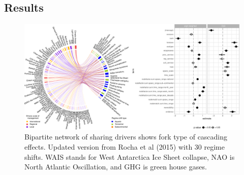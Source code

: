 \documentclass[9pt,]{article}
\begin{document}
\subsection{Results}\label{results}

\begin{figure}

{\centering \includegraphics{170830_draftCascadingEffects_files/figure-latex/Fig3-1} 

}

\caption{Bipartite network of sharing drivers shows fork type of cascading effects. Updated version from Rocha et al (2015) with 30 regime shifts. WAIS stands for West Antarctica Ice Sheet collapse, NAO is North Atlantic Oscillation, and GHG is green house gases.}\label{fig:Fig3}
\end{figure}
\end{document}
